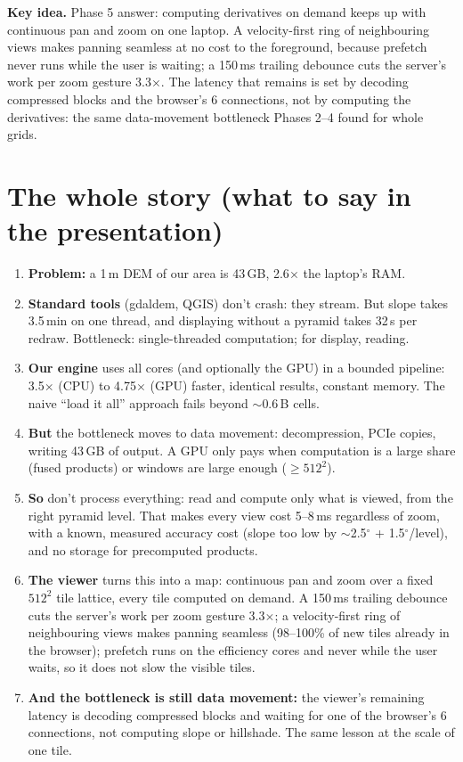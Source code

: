 ﻿\documentclass[11pt,a4paper]{article}
\newcommand{\key}[1]{\par\smallskip\noindent\colorbox{black!6}{\parbox{\dimexpr\linewidth-2\fboxsep}{\small\textbf{Key idea.} #1}}\par\smallskip}
\begin{document}
\key{Phase 5 answer: computing derivatives on demand keeps up with continuous pan and zoom on one laptop. A
velocity-first ring of neighbouring views makes panning seamless at no cost to the foreground, because prefetch never runs
while the user is waiting; a 150\,ms trailing debounce cuts the server's work per zoom gesture 3.3$\times$. The latency
that remains is set by decoding compressed blocks and the browser's 6 connections, not by computing the derivatives:
the same data-movement bottleneck Phases 2--4 found for whole grids.}

\section{The whole story (what to say in the presentation)}
\begin{enumerate}
  \item \textbf{Problem:} a 1\,m DEM of our area is 43\,GB, 2.6$\times$ the laptop's RAM.
  \item \textbf{Standard tools} (gdaldem, QGIS) don't crash: they stream. But slope takes 3.5\,min on one thread, and
  displaying without a pyramid takes 32\,s per redraw. Bottleneck: single-threaded computation; for display, reading.
  \item \textbf{Our engine} uses all cores (and optionally the GPU) in a bounded pipeline: 3.5$\times$ (CPU) to 4.75$\times$
  (GPU) faster, identical results, constant memory. The naive ``load it all'' approach fails beyond $\sim$0.6\,B cells.
  \item \textbf{But} the bottleneck moves to data movement: decompression, PCIe copies, writing 43\,GB of output. A GPU only
  pays when computation is a large share (fused products) or windows are large enough ($\geq512^2$).
  \item \textbf{So} don't process everything: read and compute only what is viewed, from the right pyramid level. That
  makes every view cost 5--8\,ms regardless of zoom, with a known, measured accuracy cost (slope too low by
  $\sim$2.5$^\circ$ + 1.5$^\circ$/level), and no storage for precomputed products.
  \item \textbf{The viewer} turns this into a map: continuous pan and zoom over a fixed $512^2$ tile lattice, every tile
  computed on demand. A 150\,ms trailing debounce cuts the server's work per zoom gesture 3.3$\times$; a velocity-first
  ring of neighbouring views makes panning seamless (98--100\% of new tiles already in the browser); prefetch runs
  on the efficiency cores and never while the user waits, so it does not slow the visible tiles.
  \item \textbf{And the bottleneck is still data movement:} the viewer's remaining latency is decoding compressed
  blocks and waiting for one of the browser's 6 connections, not computing slope or hillshade. The same lesson at
  the scale of one tile.
\end{enumerate}
\end{document}
